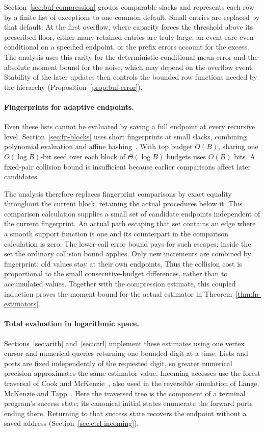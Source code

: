 Section~\ref{sec:buf-compression} groups comparable slacks and represents
each row by a finite list of exceptions to one common default. Small
entries are replaced by that default. At the first overflow, where
capacity forces the threshold above its prescribed floor, either many
retained entries are truly large, an event rare even conditional on a
specified endpoint, or the prefix errors account for the excess. The analysis
uses this rarity for the deterministic conditional-mean error and the
absolute moment bound for the noise, which may depend on the overflow
event. Stability of the later updates then controls the bounded row
functions needed by the hierarchy (Proposition~\ref{prop:buf-error}).

\paragraph{Fingerprints for adaptive endpoints.}
Even these lists cannot be evaluated by saving a full endpoint at every
recursive level. Section~\ref{sec:fp-blocks} uses short fingerprints
at small slacks, combining polynomial evaluation and affine
hashing~\cite{Schwartz1980,CarterWegman1979}. With top budget $O(B)$,
sharing one $O(\log B)$-bit seed over each block of $\Theta(\log B)$
budgets uses $O(B)$ bits. A fixed-pair collision bound is insufficient
because earlier comparisons affect later candidates.

The analysis therefore replaces fingerprint comparisons by exact
equality throughout the current block, retaining the actual procedures
below it. This comparison calculation supplies a small set of candidate
endpoints independent of the current fingerprint. An actual path
escaping that set contains an edge where a smooth support function is
one and its counterpart in the comparison calculation is zero. The
lower-call error bound pays for such escapes; inside the set the
ordinary collision bound applies. Only new increments are combined by
fingerprint: old values stay at their own endpoints. Thus the collision
cost is proportional to the small consecutive-budget differences, rather than
to accumulated values. Together with the compression estimate, this
coupled induction proves the moment bound for the actual estimator in
Theorem~\ref{thm:fp-estimators}.

\paragraph{Total evaluation in logarithmic space.}
Sections~\ref{sec:arith} and~\ref{sec:ctrl} implement these estimates
using one vertex cursor and numerical queries returning one bounded
digit at a time. Lists and ports are fixed independently of the
requested digit, so greater numerical precision approximates the same
estimator value. Incoming accesses use the forest traversal of Cook
and McKenzie~\cite[Proposition~1]{CookMcKenzie1987}, also used in the
reversible simulation of Lange, McKenzie and Tapp~\cite{LMT2000}.
Here the traversed tree is the component of a terminal program's
success state; its canonical initial states enumerate the forward
ports ending there. Returning to that success state recovers the
endpoint without a saved address (Section~\ref{sec:ctrl-incoming}).

